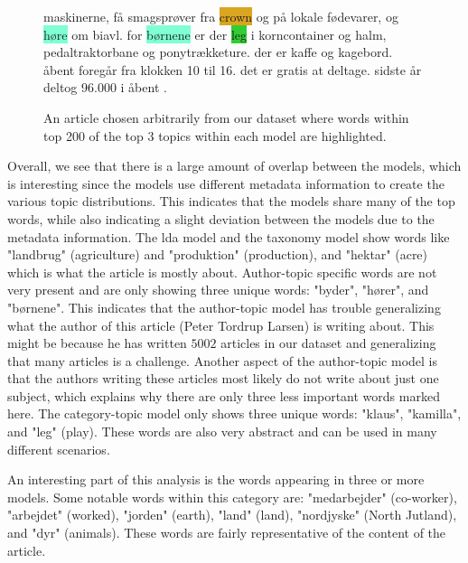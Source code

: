 \begin{figure}[h]
\begin{tcolorbox}[boxsep=5pt, top=0pt, bottom=0pt, left=0pt, right=0pt]
{maskinerne, få smagsprøver fra  \colorbox{Goldenrod}{crown} og på \colorbox{Peach}{lokale} fødevarer, og \colorbox{Aquamarine}{høre} om biavl. for \colorbox{Aquamarine}{børnene} er der \colorbox{LimeGreen}{leg} i korncontainer og halm, pedaltraktorbane og ponytrækketure. der er kaffe og kagebord. åbent  foregår  fra \colorbox{Peach}{klokken} 10 til 16. det er gratis at deltage. sidste år deltog 96.000  i åbent .
		}
	\end{tcolorbox}
	\caption{An article chosen arbitrarily from our dataset where words within top 200 of the top 3 topics within each model are highlighted.}
	\label{fig:the_article}
\end{figure}

Overall, we see that there is a large amount of overlap between the models, which is interesting since the models use different metadata information to create the various topic distributions.
This indicates that the models share many of the top words, while also indicating a slight deviation between the models due to the metadata information.
The \gls{lda} model and the taxonomy model show words like "landbrug" (agriculture) and "produktion" (production), and "hektar" (acre) which is what the article is mostly about.
Author-topic specific words are not very present and are only showing three unique words: "byder", "hører", and "børnene".
This indicates that the author-topic model has trouble generalizing what the author of this article (Peter Tordrup Larsen) is writing about. 
This might be because he has written $5002$ articles in our dataset and generalizing that many articles is a challenge.
Another aspect of the author-topic model is that the authors writing these articles most likely do not write about just one subject, which explains why there are only three less important words marked here. 
The category-topic model only shows three unique words: "klaus", "kamilla", and "leg" (play).
These words are also very abstract and can be used in many different scenarios.

An interesting part of this analysis is the words appearing in three or more models.
Some notable words within this category are: "medarbejder" (co-worker), "arbejdet" (worked), "jorden" (earth), "land" (land), "nordjyske" (North Jutland), and "dyr" (animals).
These words are fairly representative of the content of the article.

